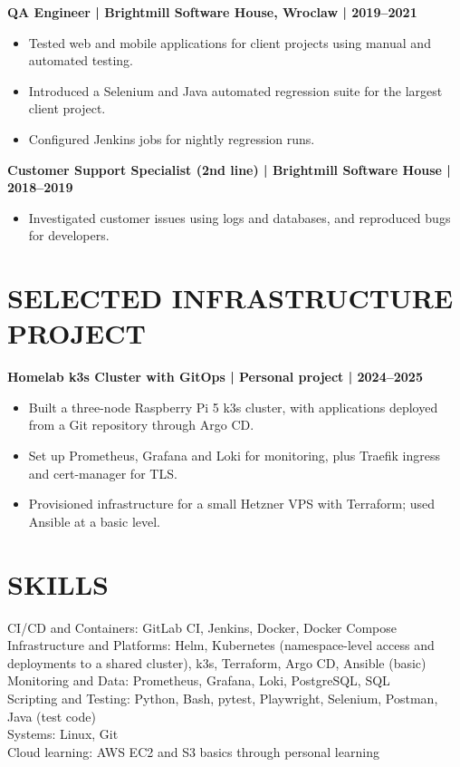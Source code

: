 \documentclass[11pt,a4paper]{article}
\begin{document}
\textbf{QA Engineer | Brightmill Software House, Wroclaw | 2019–2021}
\begin{itemize}
\item Tested web and mobile applications for client projects using manual and automated testing.
\item Introduced a Selenium and Java automated regression suite for the largest client project.
\item Configured Jenkins jobs for nightly regression runs.
\end{itemize}

\textbf{Customer Support Specialist (2nd line) | Brightmill Software House | 2018–2019}
\begin{itemize}
\item Investigated customer issues using logs and databases, and reproduced bugs for developers.
\end{itemize}

\section*{SELECTED INFRASTRUCTURE PROJECT}
\textbf{Homelab k3s Cluster with GitOps | Personal project | 2024–2025}
\begin{itemize}
\item Built a three-node Raspberry Pi 5 k3s cluster, with applications deployed from a Git repository through Argo CD.
\item Set up Prometheus, Grafana and Loki for monitoring, plus Traefik ingress and cert-manager for TLS.
\item Provisioned infrastructure for a small Hetzner VPS with Terraform; used Ansible at a basic level.
\end{itemize}

\section*{SKILLS}
CI/CD and Containers: GitLab CI, Jenkins, Docker, Docker Compose\\
Infrastructure and Platforms: Helm, Kubernetes (namespace-level access and deployments to a shared cluster), k3s, Terraform, Argo CD, Ansible (basic)\\
Monitoring and Data: Prometheus, Grafana, Loki, PostgreSQL, SQL\\
Scripting and Testing: Python, Bash, pytest, Playwright, Selenium, Postman, Java (test code)\\
Systems: Linux, Git\\
Cloud learning: AWS EC2 and S3 basics through personal learning
\end{document}
